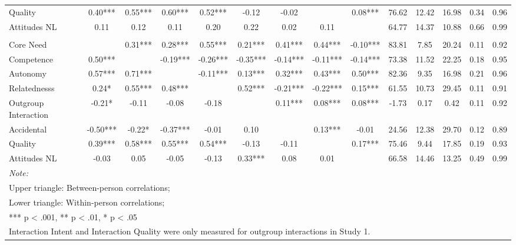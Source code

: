 \begin{table}
\begin{minipage}[t][\textheight][t]{\textwidth}
{\begin{tabular}[t]{lccccccccccccc}
\hspace{1em}Quality & 0.40*** & 0.55*** & 0.60*** & 0.52*** & -0.12 & -0.02 &  & 0.08*** & 76.62 & 12.42 & 16.98 & 0.34 & 0.96\\
\hspace{1em}Attitudes NL & 0.11 & 0.12 & 0.11 & 0.20 & 0.22 & 0.02 & 0.11 &  & 64.77 & 14.37 & 10.88 & 0.66 & 0.99\\
\addlinespace[0.3em]
\multicolumn{14}{l}{\textbf{Across Studies}}\\
\hspace{1em}Core Need &  & 0.31*** & 0.28*** & 0.55*** & 0.21*** & 0.41*** & 0.44*** & -0.10*** & 83.81 & 7.85 & 20.24 & 0.11 & 0.92\\
\hspace{1em}Competence & 0.50*** &  & -0.19*** & -0.26*** & -0.35*** & -0.14*** & -0.11*** & -0.14*** & 73.38 & 11.52 & 22.25 & 0.18 & 0.95\\
\hspace{1em}Autonomy & 0.57*** & 0.71*** &  & -0.11*** & 0.13*** & 0.32*** & 0.43*** & 0.50*** & 82.36 & 9.35 & 16.98 & 0.21 & 0.96\\
\hspace{1em}Relatednesss & 0.24* & 0.55*** & 0.48*** &  & 0.52*** & -0.21*** & -0.22*** & 0.15*** & 61.55 & 10.73 & 29.45 & 0.11 & 0.91\\
\hspace{1em}Outgroup Interaction & -0.21* & -0.11 & -0.08 & -0.18 &  & 0.11*** & 0.08*** & 0.08*** & -1.73 & 0.17 & 0.42 & 0.11 & 0.92\\
\hspace{1em}Accidental & -0.50*** & -0.22* & -0.37*** & -0.01 & 0.10 &  & 0.13*** & -0.01 & 24.56 & 12.38 & 29.70 & 0.12 & 0.89\\
\hspace{1em}Quality & 0.39*** & 0.58*** & 0.55*** & 0.54*** & -0.13 & -0.11 &  & 0.17*** & 75.46 & 9.44 & 17.85 & 0.19 & 0.93\\
\hspace{1em}Attitudes NL & -0.03 & 0.05 & -0.05 & -0.13 & 0.33*** & 0.08 & 0.01 &  & 66.58 & 14.46 & 13.25 & 0.49 & 0.99\\
\bottomrule
\multicolumn{14}{l}{\rule{0pt}{1em}\textit{Note: }}\\
\multicolumn{14}{l}{\rule{0pt}{1em}Upper triangle: Between-person correlations;}\\
\multicolumn{14}{l}{\rule{0pt}{1em}Lower triangle: Within-person correlations;}\\
\multicolumn{14}{l}{\rule{0pt}{1em}*** p < .001, ** p < .01,  * p < .05}\\
\multicolumn{14}{l}{\rule{0pt}{1em}Interaction Intent and Interaction Quality were only measured for outgroup interactions in Study 1.}\\
\end{tabular}}
\end{minipage}
\end{table}
